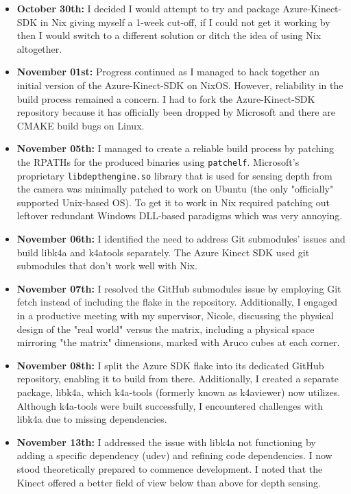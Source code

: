 \begin{itemize}
    \item \textbf{October 30th:} I decided I would attempt to try and package Azure-Kinect-SDK in Nix giving myself a 1-week cut-off, if I could not get it working by then I would switch to a different solution or ditch the idea of using Nix altogether.

    \item \textbf{November 01st:} Progress continued as I managed to hack together an initial version of the Azure-Kinect-SDK on NixOS. However, reliability in the build process remained a concern. I had to fork the Azure-Kinect-SDK repository because it has officially been dropped by Microsoft and there are CMAKE build bugs on Linux.

    \item \textbf{November 05th:} I managed to create a reliable build process by patching the RPATHs for the produced binaries using \texttt{patchelf}. Microsoft's proprietary \texttt{libdepthengine.so} library that is used for sensing depth from the camera was minimally patched to work on Ubuntu (the only "officially" supported Unix-based OS). To get it to work in Nix required patching out leftover redundant Windows DLL-based paradigms which was very annoying.

    \item \textbf{November 06th:} I identified the need to address Git submodules' issues and build libk4a and k4atools separately. The Azure Kinect SDK used git submodules that don't work well with Nix.

    \item \textbf{November 07th:} I resolved the GitHub submodules issue by employing Git fetch instead of including the flake in the repository. Additionally, I engaged in a productive meeting with my supervisor, Nicole, discussing the physical design of the "real world" versus the matrix, including a physical space mirroring "the matrix" dimensions, marked with Aruco cubes at each corner.

    \item \textbf{November 08th:} I split the Azure SDK flake into its dedicated GitHub repository, enabling it to build from there. Additionally, I created a separate package, libk4a, which k4a-tools (formerly known as k4aviewer) now utilizes. Although k4a-tools were built successfully, I encountered challenges with libk4a due to missing dependencies.

    \item \textbf{November 13th:} I addressed the issue with libk4a not functioning by adding a specific dependency (udev) and refining code dependencies. I now stood theoretically prepared to commence development. I noted that the Kinect offered a better field of view below than above for depth sensing.


\end{itemize}
